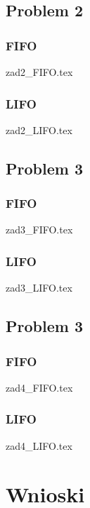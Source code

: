 \documentclass[twoside]{pracaInzynierskaMS}
\begin{document}
\newpage
\subsection     {Problem 2}
\subsubsection  {FIFO}
 {zad2_FIFO.tex}
\subsubsection  {LIFO}
 {zad2_LIFO.tex}

\newpage
\subsection     {Problem 3}
\subsubsection  {FIFO}
 {zad3_FIFO.tex}
\subsubsection  {LIFO}
 {zad3_LIFO.tex}

\newpage
\subsection     {Problem 3}
\subsubsection  {FIFO}
 {zad4_FIFO.tex}
\subsubsection  {LIFO}
 {zad4_LIFO.tex}

\section        {Wnioski}

   
\end{document}
